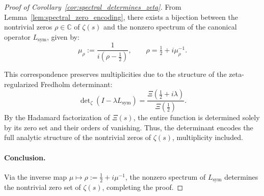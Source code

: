 \begin{proof}[Proof of Corollary~\ref{cor:spectral_determines_zeta}]
From Lemma~\ref{lem:spectral_zero_encoding}, there exists a bijection between the nontrivial zeros \( \rho \in \mathbb{C} \) of \( \zeta(s) \) and the nonzero spectrum of the canonical operator \( L_{\mathrm{sym}} \), given by:
\[
\mu_\rho := \frac{1}{i(\rho - \tfrac{1}{2})}, \qquad
\rho = \tfrac{1}{2} + i\mu_\rho^{-1}.
\]

This correspondence preserves multiplicities due to the structure of the zeta-regularized Fredholm determinant:
\[
\det\nolimits_\zeta(I - \lambda L_{\mathrm{sym}}) = \frac{\Xi(\tfrac{1}{2} + i\lambda)}{\Xi(\tfrac{1}{2})}.
\]
By the Hadamard factorization of \( \Xi(s) \), the entire function is determined solely by its zero set and their orders of vanishing. Thus, the determinant encodes the full analytic structure of the nontrivial zeros of \( \zeta(s) \), multiplicity included.

\paragraph{Conclusion.}
Via the inverse map \( \mu \mapsto \rho := \tfrac{1}{2} + i\mu^{-1} \), the nonzero spectrum of \( L_{\mathrm{sym}} \) determines the nontrivial zero set of \( \zeta(s) \), completing the proof.
\end{proof}
